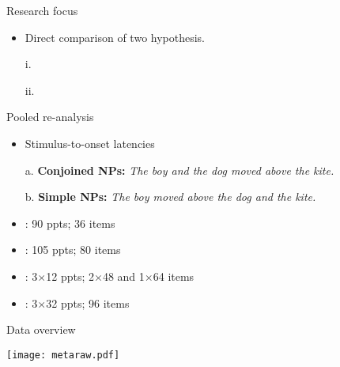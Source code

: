 
\begin{frame}{Research focus}

\begin{itemize}
	\item Direct comparison of two hypothesis.
	\item[i.] 
	\item[ii.]  


\end{itemize}

\end{frame}


\begin{frame}{Pooled re-analysis}


\begin{itemize}
	\item Stimulus-to-onset latencies
	\item[a.] \textbf{Conjoined NPs:} \textit{The boy and the dog moved above the kite.}
	\item[b.] \textbf{Simple NPs:} \textit{The boy moved above the dog and the kite.}	
\end{itemize}


\begin{itemize}
	\item \textcite{hardy2019age}: 90 ppts; 36 items
	\item \textcite{hardy2020healthy}: 105 ppts; 80 items
	\item \textcite{martin2010planning}: 3$\times$12 ppts; 2$\times$48 and 1$\times$64 items
	\item \textcite{roeser2019advance}: 3$\times$32 ppts; 96 items 
\end{itemize}


\end{frame}


\begin{frame}{Data overview}
	\begin{flushright}
		\texttt{[image: metaraw.pdf]}
	\end{flushright}
\end{frame}






